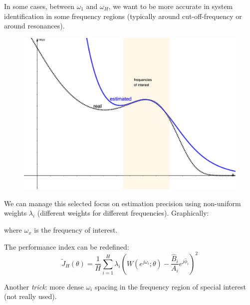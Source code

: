 \begin{remark}
    In some cases, between $\omega_1$ and $\omega_H$, we want to be more accurate in system identification in some frequency regions (typically around cut-off-frequency or around resonances).
    
    \begin{figure}[H]
        \centering
        \includegraphics[scale=4.5]{./img/freq-emphasis.png}
    \end{figure}

    We can manage this selected focus on estimation precision using non-uniform weights $\lambda_i$ (different weights for different frequencies). Graphically:

    \begin{figure}[H]
        \centering
    \end{figure}
 
    where $\omega_x$ is the frequency of interest.
    
    
    The performance index can be redefined:
    \[
        \tilde{J}_H (\theta) = \frac{1}{H} \sum_{i=1}^H \lambda_i \left(W(e^{j\omega_i};\theta) - \frac{\hat{B}_i}{A_i}e^{j\hat{\phi}_i}\right)^2
    \]

    Another \emph{trick}: more dense $\omega_i$ spacing in the frequency region of special interest (not really used).
\end{remark}
